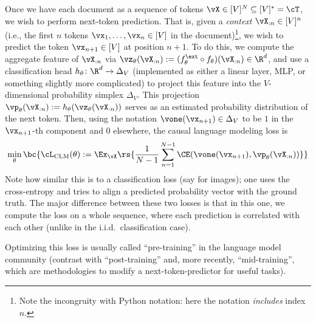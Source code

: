 \documentclass[../../book-main.tex]{subfiles}
\begin{document}
Once we have each document as a sequence of tokens \(\vX \in [V]^{N} \subseteq [V]^{*} = \cT\), we wish to perform next-token prediction. That is, given a \textit{context} \(\vX_{:n} \in [V]^{n}\) (i.e., the first \(n\) tokens \(\vx_{1}, \dots, \vx_{n} \in [V]\) in the document)\footnote{Note the incongruity with Python notation: here the notation \textit{includes} index \(n\).}, we wish to predict the token \(\vx_{n + 1} \in [V]\) at position \(n + 1\). To do this, we compute the aggregate feature of \(\vX_{:n}\) via \(\vz_{\theta}(\vX_{:n}) := (f_{\theta}^{\ext} \circ f_{\theta})(\vX_{:n}) \in \R^{d}\), and use a classification head \(h_{\theta} \colon \R^{d} \to \Delta_{V}\) (implemented as either a linear layer, MLP, or something slightly more complicated) to project this feature into the \(V\)-dimensional probability simplex \(\Delta_{V}\). This projection \(\vp_{\theta}(\vX_{:n}) := h_{\theta}(\vz_{\theta}(\vX_{:n}))\) serves as an estimated probability distribution of the next token. Then, using the notation \(\vone(\vx_{n + 1}) \in \Delta_{V}\) to be \(1\) in the \(\vx_{n + 1}\)-th component and \(0\) elsewhere, the causal language modeling loss is
\begin{equation}\label{eq:clm_loss}
    \min_{\theta}\bc{\cL_{\mathrm{CLM}}(\theta) := \Ex_{\vX}\rs{\frac{1}{N - 1}\sum_{n = 1}^{N - 1}\CE(\vone(\vx_{n + 1}), \vp_{\theta}(\vX_{:n}))}}
\end{equation}
Note how similar this is to a classification loss (say for images); one uses the cross-entropy and tries to align a predicted probability vector with the ground truth. The major difference between these two losses is that in this one, we compute the loss on a whole sequence, where each prediction is correlated with each other (unlike in the i.i.d.~classification case). 

Optimizing this loss is usually called ``pre-training'' in the language model community (contrast with ``post-training'' and, more recently, ``mid-training'', which are methodologies to modify a next-token-predictor for useful tasks).
\end{document}
